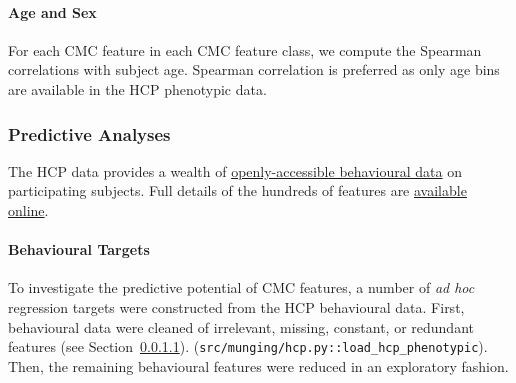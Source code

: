 \documentclass{article}
\begin{document}
\paragraph{Age and Sex} For each CMC feature in each CMC feature class, we
compute the Spearman correlations with subject age. Spearman
correlation is preferred as only age bins are available in the HCP phenotypic
data.


\subsubsection{Predictive Analyses}

The HCP data provides a wealth of
\href{https://www.humanconnectome.org/study/hcp-young-adult/document/wu-minn-hcp-consortium-open-access-data-use-terms}{openly-accessible
behavioural data} on participating subjects. Full details of the hundreds of
features are
\href{https://wiki.humanconnectome.org/docs/HCP-YA%20Data%20Dictionary-%20Updated%20for%20the%201200%20Subject%20Release.html}{available
online}.

\paragraph{Behavioural Targets} \label{sec:cleaning}

%


To investigate the predictive potential of CMC features, a number of \emph{ad
hoc} regression targets were constructed from the HCP behavioural data.
First, behavioural data were cleaned of irrelevant, missing, constant, or
redundant features (see Section~\ref{sec:cleaning}).
(\texttt{src/munging/hcp.py::load\_hcp\_phenotypic}). Then, the remaining
behavioural features were reduced in an exploratory fashion.
\end{document}
